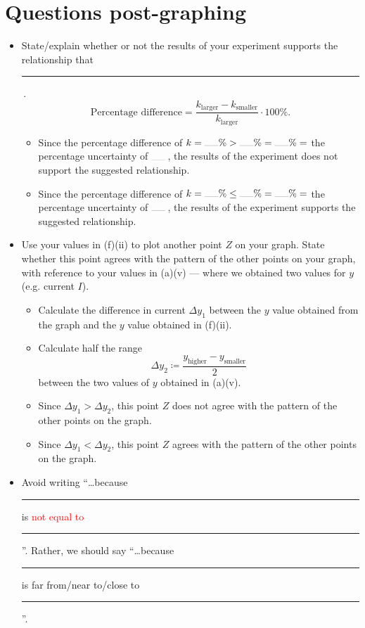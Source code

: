 \documentclass[oneside]{book}
\begin{document}
\section{Questions post-graphing}
\begin{itemize}
    \item State/explain whether or not the results of your experiment supports the relationship that \rule{1cm}{0.05mm}\,.
    \[\text{Percentage difference}=\frac{k_{\text{larger}}-k_{\text{smaller}}}{k_{\text{larger}}}\cdot 100\%.\]
    \begin{itemize}
        \item Since the percentage difference of \(k=\rule{0.5cm}{0.05mm}\%>\rule{0.5cm}{0.05mm}\%=\rule{0.5cm}{0.05mm}\%={}\)the percentage uncertainty of \(\rule{0.5cm}{0.05mm}\)\,, the results of the experiment does not support the suggested relationship.
        \item Since the percentage difference of \(k=\rule{0.5cm}{0.05mm}\%\leq\rule{0.5cm}{0.05mm}\%=\rule{0.5cm}{0.05mm}\%={}\)the percentage uncertainty of \(\rule{0.5cm}{0.05mm}\)\,, the results of the experiment supports the suggested relationship.
    \end{itemize}
    \item Use your values in (f)(ii) to plot another point \(Z\) on your graph. State whether this point agrees with the pattern of the other points on your graph, with reference to your values in (a)(v) --- where we obtained two values for \(y\) (e.g. current \(I\)).
    \begin{itemize}
        \item Calculate the difference in current \(\Delta y_1\) between the \(y\) value obtained from the graph and the \(y\) value obtained in (f)(ii).
        \item Calculate half the range 
        \[\Delta y_2\coloneq\frac{y_{\text{higher}}-y_{\text{smaller}}}{2}\] 
        between the two values of \(y\) obtained in (a)(v).
        \item Since \(\Delta y_1> \Delta y_2\), this point \(Z\) does not agree with the pattern of the other points on the graph.
        \item Since \(\Delta y_1<\Delta y_2\), this point \(Z\) agrees with the pattern of the other points on the graph.
    \end{itemize}
    \item Avoid writing ``\dots because \rule{0.5cm}{0.05mm} is \textcolor{red}{not equal to} \rule{0.5cm}{0.05mm}''. Rather, we should say ``\dots because \rule{0.5cm}{0.05mm} is \textcolor{green!70!black}{far from/near to/close to} \rule{0.5cm}{0.05mm}''. 

\end{itemize}
\end{document}
